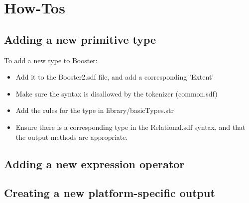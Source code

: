 \chapter{How-Tos}

\section{Adding a new primitive type}
\label{sec:addNewType}
To add a new type to Booster:
\begin{itemize}
\item Add it to the Booster2.sdf file, and add a corresponding 'Extent' 
\item Make sure the syntax is disallowed by the tokenizer (common.sdf)
\item Add the rules for the type in library/basicTypes.str
\item Ensure there is a corresponding type in the Relational.sdf
  syntax, and that the output methods are appropriate.
\end{itemize}

\section{Adding a new expression operator}
\label{sec:addNewExpressionOp}


\section{Creating a new platform-specific output}
